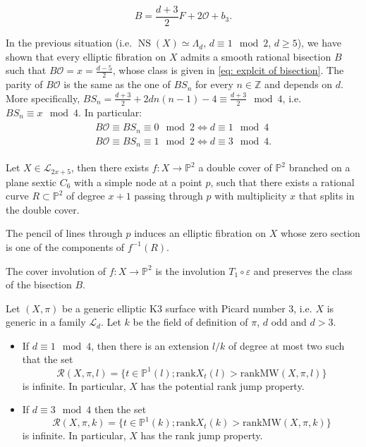 \documentclass[10pt,a4paper]{amsart}
\DeclareMathOperator{\NS}{NS}
\newcommand{\MW}{\mbox{MW}}
\newcommand{\ra}{\rightarrow}
\begin{document}
\begin{equation}\label{eq: explcit of bisection}B=\frac{d+3}{2}F+2\mathcal{O}+b_3.\end{equation}

\begin{remark}\label{rem; intersection B and sections}
In the previous situation (i.e. $\NS(X)\simeq \Lambda_d$, $d\equiv 1\mod 2$, $d\geq 5$), we have shown that every elliptic fibration on $X$ admits a smooth rational bisection $B$ such that $B\mathcal{O}=x=\frac{d-5}{2}$, whose class is given in \eqref{eq: explcit of bisection}. The parity of $B\mathcal{O}$ is the same as the one of $BS_n$ for every $n\in\mathbb{Z}$ and depends on $d$. More specifically, $BS_n=\frac{d+3}{2}+2dn(n-1)-4\equiv \frac{d+3}{2}\mod 4$, i.e. $BS_n\equiv x\mod 4$. In particular:  
\begin{eqnarray}\label{eq: intersection B sections}\begin{array}{c}B\mathcal{O}\equiv BS_n\equiv 0\mod 2 \Leftrightarrow d\equiv 1\mod 4\\
B\mathcal{O}\equiv BS_n\equiv 1\mod 2 \Leftrightarrow d\equiv 3\mod 4.\end{array}\end{eqnarray}
\end{remark}

\begin{proposition}\label{prop: Fratx cover of P2}
Let $X\in\mathcal{L}_{2x+5}$, then there exists $f:X\ra \mathbb{P}^2$ a double cover of $\mathbb{P}^2$ branched on a plane sextic $C_6$ with a simple node at a point $p$, such that there exists a rational curve $R\subset\mathbb{P}^2$ of degree $x+1$ passing through $p$ with multiplicity $x$ that splits in the double cover.

The pencil of lines through $p$ induces an elliptic fibration on $X$ whose zero section is one of the components of $f^{-1}(R)$.

The cover involution of $f:X\ra\mathbb{P}^2$ is the involution $ T_1\circ \varepsilon$ and preserves the class of the bisection $B$.
\end{proposition}

\begin{theorem}\label{thm: rank jump odd d}
Let $(X, \pi)$ be a generic elliptic K3 surface with Picard number 3, i.e. $X$ is generic in a family $\mathcal{L}_d$.  Let $k$ be the field of definition of $\pi$, $d$ odd and $d>3$. 
\begin{itemize}
\item 
If $d\equiv 1\mod 4$, then there is an extension $l/k$ of degree at most two such that the set 
\[
\mathcal{R}(X,\pi, l)=\{t\in \mathbb{P}^1(l); \mathrm{rank} X_t(l)>\mathrm{rank} \MW(X,\pi,l)\}
\] is infinite. 
In particular, $X$ has the potential rank jump property.
\item If $d\equiv 3\mod 4$ then the set 
\[
\mathcal{R}(X,\pi, k)=\{t\in \mathbb{P}^1(k); \mathrm{rank} X_t(k)> \mathrm{rank} \MW(X,\pi,k)\}
\] is infinite. 
In particular,   $X$ has the rank jump property. 
\end{itemize}
\end{theorem}
\end{document}
